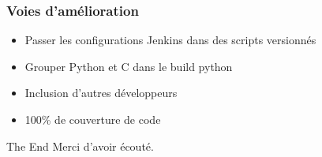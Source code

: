 \documentclass[9pt]{beamer}
\begin{document}
\subsubsection{Voies d'amélioration}
\begin{frame}{\subsubsecname}{\subsecname}
  \begin{itemize}
    \item Passer les configurations Jenkins dans des scripts versionnés
    \item Grouper Python et C dans le build python
    \item Inclusion d'autres développeurs
    \item 100\% de couverture de code
  \end{itemize}
\end{frame}


\begin{frame}{The End}
  Merci d'avoir écouté.
\end{frame}
\end{document}

